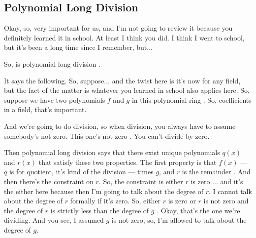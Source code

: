 \subsection{Polynomial Long Division}

\begin{speech}[00:27:36 - 00:29:16]
Okay, so, very important for us, and I'm not going to review it because you definitely learned it in school. At least I think you did. I think I went to school, but it's been a long time since I remember, but...

So, is polynomial long division .

It says the following. So, suppose... and the twist here is it's now for any field, but the fact of the matter is whatever you learned in school also applies here. So, suppose we have two polynomials $f$ and $g$ in this polynomial ring . So, coefficients in a field, that's important.

And we're going to do division, so when division, you always have to assume somebody's not zero. This one's not zero . You can't divide by zero.

Then polynomial long division says that there exist unique polynomials  $q(x)$ and $r(x)$  that satisfy these two properties. The first property is that $f(x)$ --- $q$ is for quotient, it's kind of the division --- times $g$, and $r$ is the remainder . And then there's the constraint on $r$. So, the constraint is either $r$ is zero ... and it's the either here because then I'm going to talk about the degree of $r$. I cannot talk about the degree of $r$ formally if it's zero. So, either $r$ is zero or $r$ is not zero  and the degree of $r$ is strictly less than the degree of $g$ . Okay, that's the one we're dividing. And you see, I assumed $g$ is not zero, so, I'm allowed to talk about the degree of $g$.
\end{speech}

